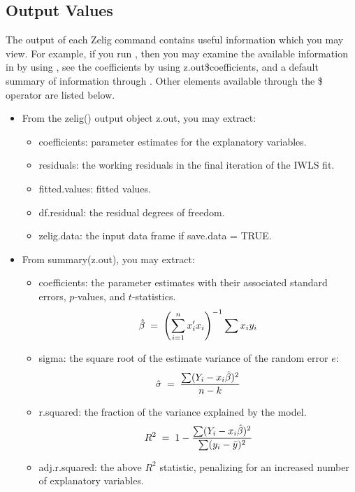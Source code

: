 \documentclass[letterpaper,10pt,english]{sphinxmanual}
\begin{document}
\subsection{Output Values}
\label{vignette:id23}
The output of each Zelig command contains useful information which you
may view. For example, if you run
, then you may examine the
available information in  by using , see the
coefficients by using z.out\$coefficients, and a default summary of
information through . Other elements available through
the \$ operator are listed below.
\begin{itemize}
\item {} 
From the zelig() output object z.out, you may extract:
\begin{itemize}
\item {} 
coefficients: parameter estimates for the explanatory variables.

\item {} 
residuals: the working residuals in the final iteration of the
IWLS fit.

\item {} 
fitted.values: fitted values.

\item {} 
df.residual: the residual degrees of freedom.

\item {} 
zelig.data: the input data frame if save.data = TRUE.

\end{itemize}

\item {} 
From summary(z.out), you may extract:
\begin{itemize}
\item {} 
coefficients: the parameter estimates with their associated
standard errors, \(p\)-values, and \(t\)-statistics.
\begin{gather}
\begin{split}\hat{\beta} \; = \; \left(\sum_{i=1}^n x_i' x_i\right)^{-1} \sum x_i y_i\end{split}\notag
\end{gather}
\item {} 
sigma: the square root of the estimate variance of the random
error \(e\):
\begin{gather}
\begin{split}\hat{\sigma} \; = \; \frac{\sum (Y_i-x_i\hat{\beta})^2}{n-k}\end{split}\notag
\end{gather}
\item {} 
r.squared: the fraction of the variance explained by the model.
\begin{gather}
\begin{split}R^2 \; = \; 1 - \frac{\sum (Y_i-x_i\hat{\beta})^2}{\sum (y_i -
         \bar{y})^2}\end{split}\notag
\end{gather}
\item {} 
adj.r.squared: the above \(R^2\) statistic, penalizing for an
increased number of explanatory variables.


\end{itemize}
\end{itemize}
\end{document}
